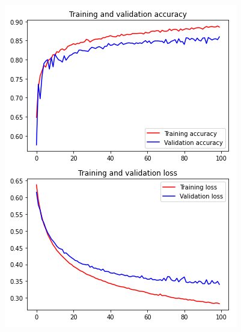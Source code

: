 \documentclass[11pt,a4paper,oneside]{article}
\begin{document}
\begin{figure}[h]
\centering
	\begin{minipage}[c]{.4\textwidth}
		\centering\setlength{\captionmargin}{0pt}%
		\includegraphics[width=.9\textwidth]{images/Task 3/VGG16 3.1/FE/Accuracy}
	\end{minipage}	
	\hspace{5mm}%
	\begin{minipage}[c]{.4\textwidth}
		\centering\setlength{\captionmargin}{0pt}%

\end{minipage}
\end{figure}
\end{document}
